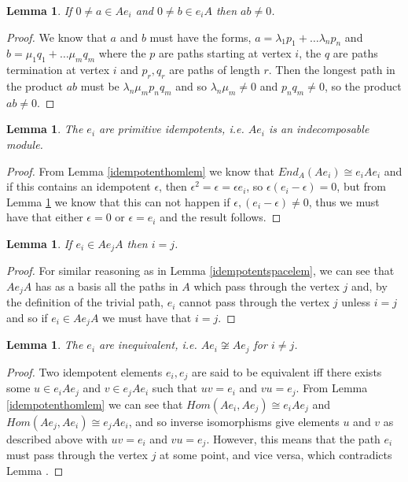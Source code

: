 \documentclass[11.5pt, twoside, a4paper, titlepage]{report}
\theoremstyle{definition}
\theoremstyle{plain}
\newtheorem{lem}[mydef]{Lemma}
\begin{document}
\begin{lem} \label{idempotent0lem}
If $0\neq a \in Ae_i$ and $0\neq b\in e_iA$ then $ab\neq 0$.
\end{lem}
\begin{proof}
We know that $a$ and $b$ must have the forms, $a=\lambda_1p_1+ \dots \lambda_np_n$ and $b=\mu_1q_1 + \dots \mu_mq_m$ where the $p$ are paths starting at vertex $i$, the $q$ are paths termination at vertex $i$ and $p_r, q_r$ are paths of length $r$. Then the longest path in the product $ab$ must be $\lambda_n\mu_mp_nq_m$ and so $\lambda_n\mu_m \neq 0$ and $p_nq_m \neq 0$, so the product $ab\neq 0$.
\end{proof}

\begin{lem}
The $e_i$ are primitive idempotents, i.e. $Ae_i$ is an indecomposable module.
\end{lem}
\begin{proof}
From Lemma \ref{idempotenthomlem} we know that $End_A(Ae_i) \cong e_iAe_i$ and if this contains an idempotent $\epsilon$, then $\epsilon^2=\epsilon=\epsilon e_i$, so $\epsilon(e_i- \epsilon)=0$, but from Lemma \ref{idempotent0lem} we know that this can not happen if $\epsilon, (e_i-\epsilon) \neq 0$, thus we must have that either $\epsilon=0$ or $\epsilon=e_i$ and the result follows.
\end{proof}

\begin{lem} \label{idempotentsi=jlem}
If $e_i \in Ae_jA$ then $i=j$.
\end{lem}
\begin{proof}
For similar reasoning as in Lemma \ref{idempotentspacelem}, we can see that $Ae_jA$ has as a basis all the paths in $A$ which pass through the vertex $j$ and, by the definition of the trivial path, $e_i$ cannot pass through the vertex $j$ unless $i=j$ and so if $e_i \in Ae_jA$ we must have that $i=j$.
\end{proof}

\begin{lem}
The $e_i$ are inequivalent, i.e. $Ae_i \not\cong Ae_j$ for $i \neq j$.
\end{lem}
\begin{proof}
Two idempotent elements $e_i, e_j$ are said to be equivalent iff there exists some $u\in e_iAe_j$ and $v \in e_jAe_i$ such that $uv=e_i$ and $vu=e_j$. From Lemma \ref{idempotenthomlem} we can see that $Hom(Ae_i, Ae_j)\cong e_iAe_j$ and $Hom(Ae_j, Ae_i)\cong e_jAe_i$, and so inverse isomorphisms give elements $u$ and $v$ as described above with $uv=e_i$ and $vu=e_j$. However, this means that the path $e_i$ must pass through the vertex $j$ at some point, and vice versa, which contradicts Lemma \label{idempotenti=jlem}.
\end{proof}
\end{document}
